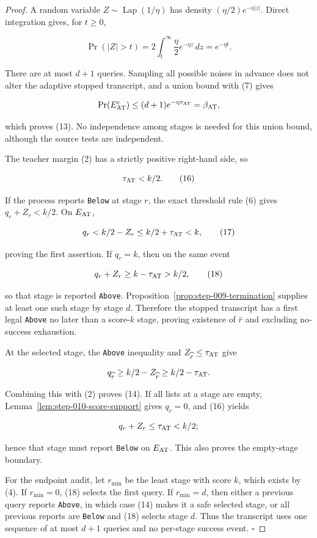 \begin{proof}
A random variable
\(Z\sim\operatorname{Lap}(1/\eta)\) has density
\((\eta/2)e^{-\eta|z|}\). Direct integration gives, for \(t\geq0\),

\[
 \Pr(|Z|>t)
 =2\int_t^\infty\frac{\eta}{2}e^{-\eta z}\,dz
 =e^{-\eta t}.
 \tag{15}
\]

There are at most \(d+1\) queries. Sampling all possible noises in advance
does not alter the adaptive stopped transcript, and a union bound with (7)
gives

\[
 \Pr(E_{\rm AT}^c)
 \leq(d+1)e^{-\eta\tau_{\rm AT}}
 =\beta_{\rm AT},
\]

which proves (13). No independence among stages is needed for this union
bound, although the source tests are independent.

The teacher margin (2) has a strictly positive right-hand side, so

\[
 \tau_{\rm AT}<k/2.
 \tag{16}
\]

If the process reports \texttt{Below} at stage \(r\), the exact threshold rule (6)
gives \(q_r+Z_r<k/2\). On \(E_{\rm AT}\),

\[
 q_r<k/2-Z_r\leq k/2+\tau_{\rm AT}<k,
 \tag{17}
\]

proving the first assertion. If \(q_r=k\), then on the same event

\[
 q_r+Z_r\geq k-\tau_{\rm AT}>k/2,
 \tag{18}
\]

so that stage is reported \texttt{Above}. Proposition~\ref{prop:step-009-termination} supplies at least one such stage
by stage \(d\). Therefore the stopped transcript has a first legal \texttt{Above}
no later than a score-\(k\) stage, proving existence of \(\widehat r\) and
excluding no-success exhaustion.

At the selected stage, the \texttt{Above} inequality and
\(Z_{\widehat r}\leq\tau_{\rm AT}\) give

\[
 q_{\widehat r}
 \geq k/2-Z_{\widehat r}
 \geq k/2-\tau_{\rm AT}.
\]

Combining this with (2) proves (14). If all lists at a stage are empty,
Lemma~\ref{lem:step-010-score-support} gives \(q_r=0\), and (16) yields

\[
 q_r+Z_r\leq\tau_{\rm AT}<k/2;
\]

hence that stage must report \texttt{Below} on \(E_{\rm AT}\). This also proves
the empty-stage boundary.

For the endpoint audit, let \(r_{\min}\) be the least stage with score
\(k\), which exists by (4). If \(r_{\min}=0\), (18) selects the first query.
If \(r_{\min}=d\), then either a previous query reports \texttt{Above}, in which
case (14) makes it a safe selected stage, or all previous reports are
\texttt{Below} and (18) selects stage \(d\). Thus the transcript uses one sequence
of at most \(d+1\) queries and no per-stage success event. \(\square\)


\end{proof}

